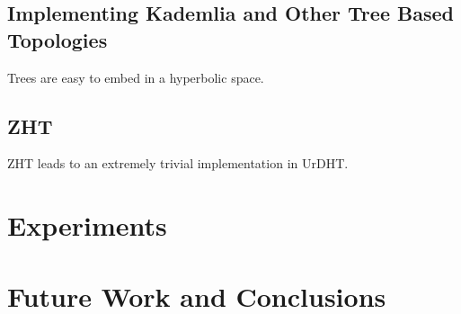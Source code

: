 \documentclass[11pt,conference]{IEEEtran}
\begin{document}
	
	\subsection{Implementing Kademlia and Other Tree Based Topologies}
	Trees are easy to embed in a hyperbolic space.
	\subsection{ZHT}
	ZHT leads to an extremely trivial implementation in UrDHT.
	
\section{Experiments}
\label{sec:experiments}

\section{Future Work and Conclusions}
\label{sec:future}



\end{document}
